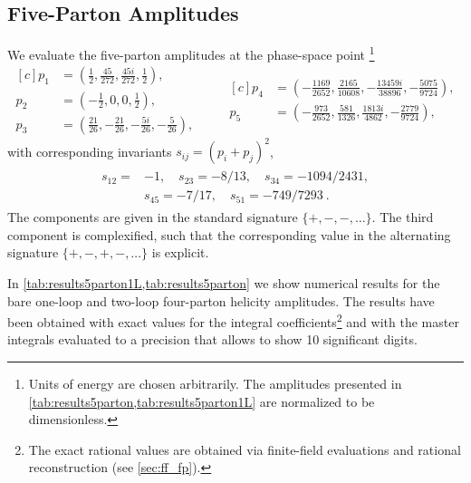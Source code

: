 \subsection{Five-Parton Amplitudes}
\label{sec:fivepartonRes}
We evaluate the five-parton amplitudes at the phase-space point%
\footnote{Units of energy are chosen arbitrarily.
  The amplitudes presented in \cref{tab:results5parton,tab:results5parton1L}
  are normalized to be dimensionless.
}
\begin{equation}
  \begin{aligned}[c]
    p_1 &= \left( \frac{1}{2}, \frac{45}{272}, \frac{45 i}{272}, \frac{1}{2} \right), \\
    p_2 &= \left( -\frac{1}{2}, 0, 0, \frac{1}{2} \right), \\
    p_3 &= \left( \frac{21}{26}, -\frac{21}{26}, -\frac{5 i}{26}, -\frac{5}{26} \right),
  \end{aligned}
  \qquad
  \begin{aligned}[c]
    p_4 &= \left( -\frac{1169}{2652}, \frac{2165}{10608}, -\frac{13459 i}{38896}, -\frac{5075}{9724} \right),\\[3ex]
    p_5 &= \left( -\frac{973}{2652}, \frac{581}{1326}, \frac{1813 i}{4862}, -\frac{2779}{9724} \right),
  \end{aligned}
  \label{eq:EvalPoint5}
\end{equation}
with corresponding invariants $s_{ij}=(p_i+p_j)^2$,
\begin{align}
  \label{eq:Invs5pt}
  \begin{split}
    s_{12} =& -1, \quad s_{23} = -8/13, \quad s_{34} = -1094/2431,\\
    &s_{45} = -7/17, \quad s_{51} = -749/7293\ .
  \end{split}
\end{align}
The components are given in the standard signature $\{+,-,-,\ldots{}\}$.
The third component is complexified, such that the corresponding value in the alternating signature $\{+,-,+,-,\ldots{}\}$ 
is explicit.

In \cref{tab:results5parton1L,tab:results5parton} we show numerical results for
the bare one-loop and two-loop four-parton helicity amplitudes.
The results have been obtained with exact values for the 
integral coefficients\footnote{
  The exact rational values are obtained via finite-field evaluations and rational reconstruction (see \cref{sec:ff_fp}).
} 
and with the master integrals 
evaluated to a precision that allows to show 10
significant digits.


